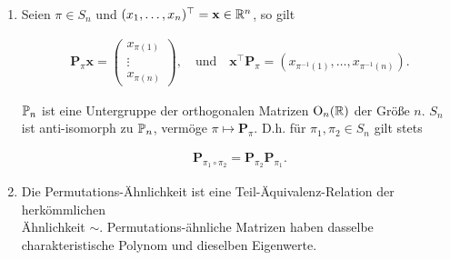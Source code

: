             \begin{lemma} \label{lem:permutation_matrices}

                \begin{enumerate}[
                    label = \arabic*.,
                    wide,
                    labelindent = 0pt
                ]

                    \item Seien $\pi \in S_n$ und $(x_1, \dots, x_n)^\top = \mathbf x \in \R^n$, so gilt

                    \begin{align*}
                        \mathbf P_\pi \mathbf x
                        =
                        \begin{pmatrix}
                            x_{\pi(1)} \\ \vdots \\ x_{\pi(n)}
                        \end{pmatrix},
                        \quad
                        \text{und}
                        \quad
                        \mathbf x^\top \mathbf P_\pi
                        =
                        (x_{\pi^{-1}(1)}, \dots, x_{\pi^{-1}(n)}).
                    \end{align*}

                    $\P_n$ ist eine Untergruppe der orthogonalen Matrizen $\operatorname O_n(\R)$ der Größe $n$.
                    $S_n$ ist anti-isomorph zu $\P_n$, vermöge $\pi \mapsto \mathbf P_\pi$.
                    D.h. für $\pi_1, \pi_2 \in S_n$ gilt stets

                    \begin{align*}
                        \mathbf P_{\pi_1 \circ \pi_2}
                        =
                        \mathbf P_{\pi_2} \mathbf P_{\pi_1}.
                    \end{align*}

                    \item Die Permutations-Ähnlichkeit ist eine Teil-Äquivalenz-Relation der herkömmlichen \\ Ähnlichkeit $\sim$.
                    Permutations-ähnliche Matrizen haben dasselbe charakteristische Polynom und dieselben Eigenwerte.

                \end{enumerate}

            \end{lemma}


